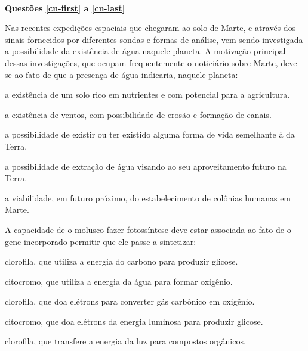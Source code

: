 \separador
{}\\
\noindent\textbf{Questões \ref{cn-first} a \ref{cn-last}} %

%
%

\questao \label{cn-first}
Nas recentes expedições espaciais que chegaram ao solo de Marte, e através dos sinais fornecidos por diferentes sondas e formas de análise, vem sendo investigada a possibilidade da existência de água naquele planeta. A motivação principal dessas investigações, que ocupam frequentemente o noticiário sobre Marte, deve-se ao fato de que a presença de água indicaria, naquele planeta:
\begin{alternativas}
\item a existência de um solo rico em nutrientes e com potencial para a agricultura. 
\item a existência de ventos, com possibilidade de erosão e formação de canais. 
\item a possibilidade de existir ou ter existido alguma forma de vida semelhante à da Terra. 
\item a possibilidade de extração de água visando ao seu aproveitamento futuro na Terra. 
\item a viabilidade, em futuro próximo, do estabelecimento de colônias humanas em Marte.
\end{alternativas}

\questao
{}
A capacidade de o molusco fazer fotossíntese deve estar associada ao fato de o gene incorporado permitir que ele passe a sintetizar:
\begin{alternativas}
\item clorofila, que utiliza a energia do carbono para produzir glicose. 
\item citocromo, que utiliza a energia da água para formar oxigênio. 
\item clorofila, que doa elétrons para converter gás carbônico em oxigênio. 
\item citocromo, que doa elétrons da energia luminosa para produzir glicose. 
\item clorofila, que transfere a energia da luz para compostos orgânicos.
\end{alternativas}

